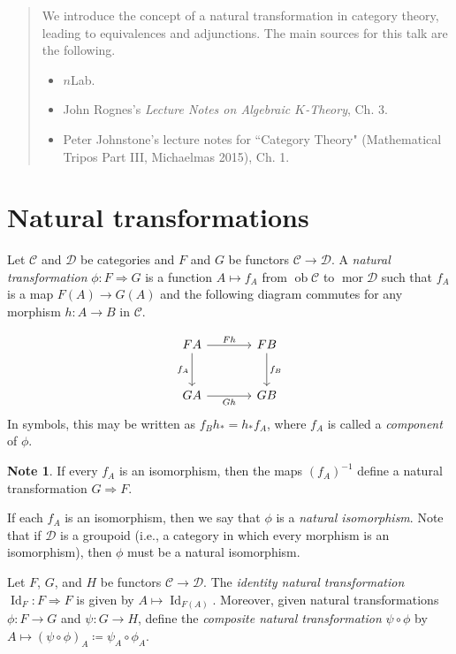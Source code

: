 \documentclass[10pt,letterpaper,cm]{nupset}
\theoremstyle{definition}
\newtheorem{note}[definition]{Note}
\theoremstyle{theorem}
\theoremstyle{remark}
\newcommand{\1}{\mathbf{1}}
\renewcommand{\c}{\mathscr{C}}
\renewcommand{\d}{\mathscr{D}}
\newcommand{\0}{\vec 0}
\DeclareMathOperator{\id}{Id}
\DeclareMathOperator{\ob}{ob}
\DeclareMathOperator{\mor}{mor}
\begin{document}
\begin{abstract}
We introduce the concept of a natural transformation in category theory, leading to equivalences and adjunctions. The main sources for this talk are the following.
\begin{itemize}
\item $n$Lab.
\item John Rognes's \textit{Lecture Notes on Algebraic $K$-Theory}, Ch. 3.
\item Peter Johnstone's lecture notes for ``Category Theory" (Mathematical Tripos Part III, Michaelmas 2015), Ch. 1.
\end{itemize}
\end{abstract}

\smallskip

\section{Natural transformations}


Let $\c$ and $\d$ be categories and $F$ and $G$ be functors $\c \to \d$.  A \textit{natural transformation} $\phi :F \Rightarrow G$  is a function $A \mapsto f_A$ from $\ob \c$ to $\mor \d$ such that $f_A$ is a map  $F(A) \to G(A)$ and the following diagram commutes for any morphism $h: A \to B$ in $\c$.

\[
\begin{tikzcd}[row sep=large, column sep = large]
FA \arrow[r, "F{h}"] \arrow[d, "f_A", swap]
& FB \arrow[d, "f_B"] \\
GA \arrow[r, "G{h}"']
& GB
\end{tikzcd}
\]
In symbols, this may be written as $f_Bh_{\ast} = h_{\ast}f_A$, where $f_A$ is called a \textit{component} of $\phi$.


\begin{note}\label{rmk}
If every $f_A$ is an isomorphism, then the maps $\left(f_A\right)^{{-1}}$ define a natural transformation $G \Rightarrow F$.
\end{note}

If each $f_A$ is an isomorphism, then we say that $\phi$ is a \textit{natural isomorphism}.
Note that if $\d$ is a groupoid (i.e., a category in which every morphism is an isomorphism), then $\phi$ must be a natural isomorphism.

\medskip

Let $F$, $G$, and $H$ be functors $\c \to \d$. The \textit{identity natural transformation} $\id_F : F \Rightarrow F$ is given by $A \mapsto \id_{F(A)}$. Moreover, given natural transformations $\phi: F \to G$ and $\psi: G \to H$, define the \textit{composite natural transformation} $\psi \circ \phi$ by $A \mapsto (\psi \circ \phi)_A \coloneqq \psi_{A} \circ \phi_{A}$.
\end{document}
